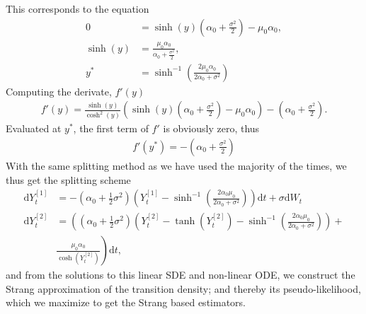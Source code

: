 This corresponds to the equation 
\begin{align}
    0 &= \sinh(y)\left(\alpha_0 + \frac{\sigma^2}{2}\right) - \mu_0 \alpha_0,\nonumber\\
    \sinh(y) &= \frac{\mu_0\alpha_0}{\alpha_0 + \frac{\sigma^2}{2}}, \nonumber\\
    y^* &= \sinh^{-1}\left(\frac{2\mu_0\alpha_0}{2\alpha_0 + \sigma^2}\right)
\end{align}
Computing the derivate, $f'(y)$
\begin{align}
    f'(y) = \frac{\sinh(y)}{\cosh^2(y)}\left(\sinh(y)\left(\alpha_0 + \frac{\sigma^2}{2}\right) - \mu_0\alpha_0\right) - \left(\alpha_0 + \frac{\sigma^2}{2}\right).
\end{align}
Evaluated at $y^*$, the first term of $f'$ is obviously zero, thus
\begin{align}
    f'(y^*) = -\left(\alpha_0 + \frac{\sigma^2}{2}\right)
\end{align}
With the same splitting method as we have used the majority of the times, we thus get the splitting scheme
\begin{align}
    \mathrm{d}Y_t^{[1]} &= -\left(\alpha_0 + \frac{1}{2}\sigma^2\right)\left(Y_t^{[1]} - \sinh^{-1}\left(\frac{2\alpha_0\mu_0}{2\alpha_0 + \sigma^2}\right)\right)\mathrm{d}t + \sigma \mathrm{d}W_t \\
    \mathrm{d}Y_t^{[2]} &= \left(\left(\alpha_0 + \frac{1}{2}\sigma^2\right) \left(Y_t^{[2]} - \tanh\left(Y_t^{[2]}\right) - \sinh^{-1}\left(\frac{2\alpha_0\mu_0}{2\alpha_0 + \sigma^2}\right)\right) + \right. \nonumber \\
    &\left. \frac{\mu_0\alpha_0}{\cosh\left(Y_t^{[2]}\right)}\right)\mathrm{d}t, \label{eq:StrangTDiffusion}
\end{align}
and from the solutions to this linear SDE and non-linear ODE, we construct the Strang approximation of the transition density; and thereby its pseudo-likelihood, which we maximize to get the Strang based estimators.

